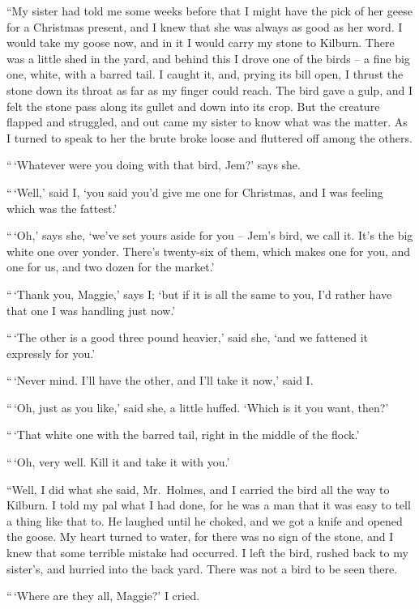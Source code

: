 “My sister had told me some weeks before that I might
have the pick of her geese for a Christmas present, and I knew
that she was always as good as her word. I would take my
goose now, and in it I would carry my stone to Kilburn.
There was a little shed in the yard, and behind this I drove
one of the birds -- a fine big one, white, with a barred tail. I
caught it, and, prying its bill open, I thrust the stone down
its throat as far as my finger could reach. The bird gave a
gulp, and I felt the stone pass along its gullet and down into
its crop. But the creature flapped and struggled, and out
came my sister to know what was the matter. As I turned
to speak to her the brute broke loose and fluttered off among
the others.

“\,‘Whatever were you doing with that bird, Jem?’ says she.

“\,‘Well,’ said I, ‘you said you’d give me one for Christmas,
and I was feeling which was the fattest.’

“\,‘Oh,’ says she, ‘we’ve set yours aside for you -- Jem’s bird,
we call it. It’s the big white one over yonder. There’s twenty-six
of them, which makes one for you, and one for us, and
two dozen for the market.’

“\,‘Thank you, Maggie,’ says I; ‘but if it is all the same to
you, I’d rather have that one I was handling just now.’

“\,‘The other is a good three pound heavier,’ said she, ‘and
we fattened it expressly for you.’

“\,‘Never mind. I’ll have the other, and I’ll take it now,’
said I.

“\,‘Oh, just as you like,’ said she, a little huffed. ‘Which is
it you want, then?’

“\,‘That white one with the barred tail, right in the middle
of the flock.’

“\,‘Oh, very well. Kill it and take it with you.’

“Well, I did what she said, Mr.~Holmes, and I carried the
bird all the way to Kilburn. I told my pal what I had done,
for he was a man that it was easy to tell a thing like that to.
He laughed until he choked, and we got a knife and opened
the goose. My heart turned to water, for there was no sign
of the stone, and I knew that some terrible mistake had occurred.
I left the bird, rushed back to my sister’s, and hurried
into the back yard. There was not a bird to be seen there.

“\,‘Where are they all, Maggie?’ I cried.

